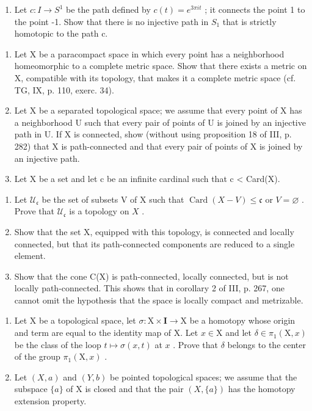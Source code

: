 \begin{enumerate}
\def\labelenumi{\alph{enumi})}
\setcounter{enumi}{1}
\tightlist
\item
  Let \(c: I \to S^{1}\) be the path defined by \(c(t) = e^{3\pi it}\) ; it connects the point 1 to the point -1. Show that there is no injective path in \(S_{1}\) that is strictly homotopic to the path c.
\end{enumerate}

\begin{enumerate}
\def\labelenumi{\arabic{enumi})}
\setcounter{enumi}{11}
\item
  Let X be a paracompact space in which every point has a neighborhood homeomorphic to a complete metric space. Show that there exists a metric on X, compatible with its topology, that makes it a complete metric space (cf. TG, IX, p. 110, exerc. 34).
\item
  Let X be a separated topological space; we assume that every point of X has a neighborhood U such that every pair of points of U is joined by an injective path in U. If X is connected, show (without using proposition 18 of III, p. 282) that X is path-connected and that every pair of points of X is joined by an injective path.
\item
  Let X be a set and let c be an infinite cardinal such that c \textless{} Card(X).
\end{enumerate}

\begin{enumerate}
\def\labelenumi{\alph{enumi})}
\item
  Let \(\mathcal{U}_{\mathfrak{c}}\) be the set of subsets V of X such that \(\operatorname{Card}(X - V) \leqslant \mathfrak{c}\) or \(V = \varnothing\) . Prove that \(\mathcal{U}_{\mathfrak{c}}\) is a topology on \(X\) .
\item
  Show that the set X, equipped with this topology, is connected and locally connected, but that its path-connected components are reduced to a single element.
\item
  Show that the cone C(X) is path-connected, locally connected, but is not locally path-connected. This shows that in corollary 2 of III, p. 267, one cannot omit the hypothesis that the space is locally compact and metrizable.
\end{enumerate}

\exercisegroup

\begin{enumerate}
\def\labelenumi{\arabic{enumi})}
\item
  Let X be a topological space, let \(\sigma: \mathrm{X} \times \mathbf{I} \to \mathrm{X}\) be a homotopy whose origin and term are equal to the identity map of X. Let \(x \in \mathrm{X}\) and let \(\delta \in \pi_1(\mathrm{X}, x)\) be the class of the loop \(t \mapsto \sigma(x, t)\) at \(x\) . Prove that \(\delta\) belongs to the center of the group \(\pi_1(\mathrm{X}, x)\) .
\item
  Let \((X, a)\) and \((Y, b)\) be pointed topological spaces; we assume that the subspace \(\{a\}\) of X is closed and that the pair \((X, \{a\})\) has the homotopy extension property.
\end{enumerate}


